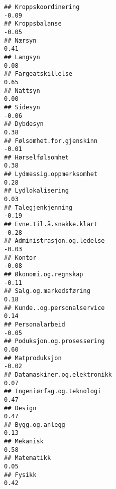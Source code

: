 \documentclass[
]{article}
\begin{document}
\begin{verbatim}
## Kroppskoordinering                                                               -0.09
## Kroppsbalanse                                                                    -0.05
## Nærsyn                                                                            0.41
## Langsyn                                                                           0.08
## Fargeatskillelse                                                                  0.65
## Nattsyn                                                                           0.00
## Sidesyn                                                                          -0.06
## Dybdesyn                                                                          0.38
## Følsomhet.for.gjenskinn                                                          -0.01
## Hørselfølsomhet                                                                   0.38
## Lydmessig.oppmerksomhet                                                           0.28
## Lydlokalisering                                                                   0.03
## Talegjenkjenning                                                                 -0.19
## Evne.til.å.snakke.klart                                                          -0.28
## Administrasjon.og.ledelse                                                        -0.03
## Kontor                                                                           -0.08
## Økonomi.og.regnskap                                                              -0.11
## Salg.og.markedsføring                                                             0.18
## Kunde..og.personalservice                                                         0.14
## Personalarbeid                                                                   -0.05
## Poduksjon.og.prosessering                                                         0.60
## Matproduksjon                                                                    -0.02
## Datamaskiner.og.elektronikk                                                       0.07
## Ingeniørfag.og.teknologi                                                          0.47
## Design                                                                            0.47
## Bygg.og.anlegg                                                                    0.13
## Mekanisk                                                                          0.58
## Matematikk                                                                        0.05
## Fysikk                                                                            0.42

\end{verbatim}
\end{document}
